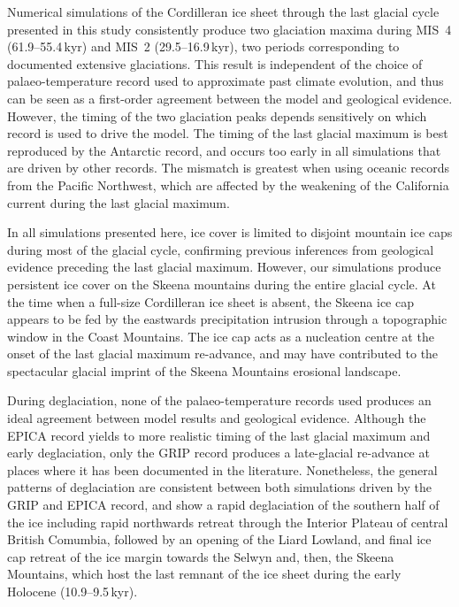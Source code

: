 \documentclass[tc, manuscript]{copernicus}
\begin{document}
Numerical simulations of the Cordilleran ice sheet through the last glacial
cycle presented in this study consistently produce two glaciation maxima during
MIS~4 (61.9--55.4\,kyr) and MIS~2 (29.5--16.9\,kyr), two periods
corresponding to documented extensive glaciations. This result is
independent of the choice of palaeo-temperature record used to approximate past
climate evolution, and thus
can be seen as a first-order agreement between the model and geological
evidence. However, the timing of the two glaciation peaks depends sensitively
on which record
is used to drive the model. The timing of the last glacial maximum is best
reproduced by the Antarctic record, and occurs too early in all simulations
that are driven by other records. The mismatch is greatest when using
oceanic records from the Pacific Northwest, which are affected by the
weakening of the California current during the last glacial maximum.

In all simulations presented here, ice cover is limited to disjoint mountain ice
caps during most of the glacial cycle, confirming previous inferences from
geological evidence preceding the last glacial maximum. However, our
simulations produce persistent ice cover on the Skeena mountains during
the entire glacial cycle. At the time when a full-size Cordilleran ice sheet is
absent, the Skeena ice cap appears to be fed by the eastwards precipitation
intrusion through a topographic window in the Coast Mountains. The ice cap acts
as a nucleation centre at the onset of the last glacial maximum re-advance, and
may have contributed to the spectacular glacial imprint of the Skeena Mountains
erosional landscape.

During deglaciation, none of the palaeo-temperature records used produces an
ideal agreement between model results and geological evidence. Although
the EPICA record yields to more realistic timing of the last glacial maximum
and early deglaciation, only the GRIP record produces a late-glacial re-advance
at places where it has been documented in the literature. Nonetheless, the
general patterns of deglaciation are consistent between both simulations driven
by the GRIP and EPICA record, and show a rapid deglaciation of the southern
half of the ice including rapid northwards retreat through the Interior
Plateau of central British Comumbia, followed by an opening of the Liard
Lowland, and final ice cap retreat of the ice margin towards the Selwyn and,
then, the Skeena Mountains, which host the last remnant of the ice sheet
during the early Holocene (10.9--9.5\,kyr).
\end{document}
